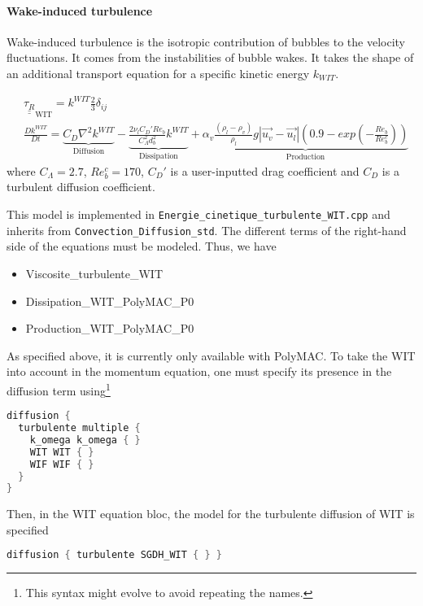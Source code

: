 \paragraph{Wake-induced turbulence}\mbox{}

Wake-induced turbulence is the isotropic contribution of bubbles to the velocity fluctuations. It comes from the instabilities of bubble wakes. It takes the shape of an additional transport equation for a specific kinetic energy $k_{WIT}$.

\begin{align}
	&\underline{\underline{\tau_R}}_{\text{WIT}} = k^{WIT}\frac{2}{3}\delta_{ij}\\
	&\frac{D k^{WIT}}{Dt} = 
			\underbrace{C_D\nabla^2 k^{WIT} }_\text{Diffusion} 
				- \underbrace{\frac{2 \nu_l C_D' Re_b}{C_\Lambda^2 d_b^2}k^{WIT} }_\text{Dissipation}
				+ \underbrace{\alpha_v \frac{(\rho_l-\rho_v)}{\rho_l} g |\vec{u_v}-\vec{u_l}|\left(0.9 - exp\left(-\frac{Re_b}{Re_b^c}\right)\right) }_\text{Production}
\end{align}
where $C_\Lambda = 2.7$, $Re_b^c = 170$, $C_D'$ is a user-inputted drag coefficient and $C_D$ is a turbulent diffusion coefficient.

This model is implemented in \texttt{Energie_cinetique_turbulente_WIT.cpp} and inherits from \texttt{Convection_Diffusion_std}. The different terms of the right-hand side of the equations must be modeled. Thus, we have
\begin{itemize}
    \item Viscosite_turbulente_WIT
    \item Dissipation_WIT_PolyMAC_P0
    \item Production_WIT_PolyMAC_P0
\end{itemize}

As specified above, it is currently only available with PolyMAC. To take the WIT into account in the momentum equation, one must specify its presence in the diffusion term using\footnote{This syntax might evolve to avoid repeating the names.} 

\begin{lstlisting}[language=c++]
diffusion { 
  turbulente multiple { 
    k_omega k_omega { } 
    WIT WIT { } 
    WIF WIF { } 
  } 
}
\end{lstlisting}

Then, in the WIT equation bloc, the model for the turbulente diffusion of WIT is specified
\begin{lstlisting}[language=c++]
diffusion { turbulente SGDH_WIT { } }
\end{lstlisting}

